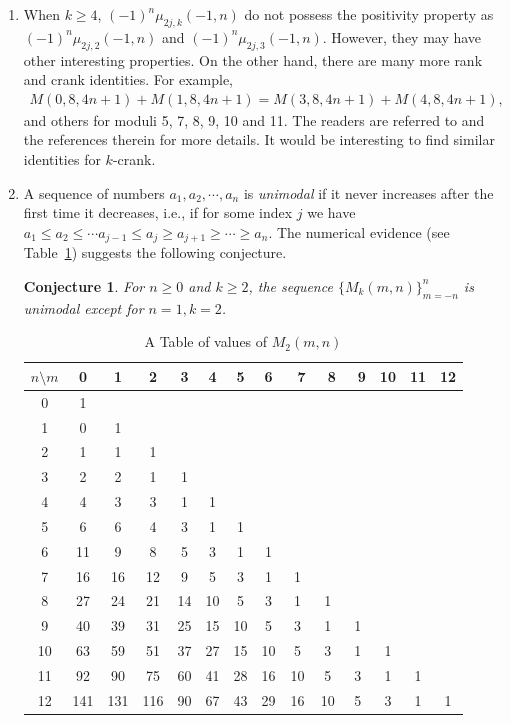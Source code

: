 \documentclass[12pt]{amsart}
\numberwithin{equation}{section}
\theoremstyle{plain}
\newtheorem{conjecture}[theorem]{Conjecture}
\theoremstyle{definition}
\begin{document}
\begin{enumerate}[1)]
\item When $k\geq4$, $(-1)^{n}\mu_{2j,k}(-1,n)$ do not possess the positivity property as $(-1)^{n}\mu_{2j,2}(-1,n)$ and $(-1)^{n}\mu_{2j,3}(-1,n)$. However, they may have other interesting properties. On the other hand, there are many more rank and crank identities. For example,
\begin{align*}
M(0,8,4n+1)+M(1,8,4n+1)=M(3,8,4n+1)+M(4,8,4n+1),
\end{align*}
and others for moduli 5, 7, 8, 9, 10 and 11. The readers are referred to \cite{Gar1,Gar3,LS} and the references therein for more details. It would be interesting to find similar identities for $k$-crank.

\item A sequence of numbers $a_{1}, a_{2}, \cdots, a_{n}$ is \emph{unimodal} if it never increases after the first time it decreases, i.e., if for some index $j$ we have $a_{1}\leq a_{2}\leq\cdots a_{j-1}\leq a_{j}\geq a_{j+1}\geq\cdots\geq a_n$. The numerical evidence (see Table~\ref{Tab1}) suggests the following conjecture.
\begin{conjecture}\label{conj:unimodal}
For $n\geq 0$ and $k\geq 2$, the sequence $\{M_{k}(m,n)\}_{m=-n}^{n}$ is unimodal except for $n=1,k=2$.
\end{conjecture}
\begin{table}[tbp]\caption{A Table of values of $M_{2}(m,n)$}\label{Tab1}
\centering
\begin{tabular}{cccccccccccccc}
\hline
$n\setminus m$ &0 &1 &2 &3 &4 &5 &6 &~7 &~8 &~9 &10 &11 & 12\\
\hline
0 &1 & & & & & & & & & & &\\
1 &0 &1 & & & & & & & & & &\\
2 &1 &1 &1 & & & & & & & & &\\
3 &2 &2 &1 &1 & & & & & & & &\\
4 &4 &3 &3 &1 &1 & & & & & & &\\
5 &6 &6 &4 &3 &1 &1 & & & & & &\\
6 &11 &9 &8 &5 &3 &1 &1 & & & & &\\
7 &16 &16 &12 &9 &5 &3 &1 &1 & & & &\\
8 &27 &24 &21 &14 &10 &5 &3 &1 &1 & & &\\
9 &40 &39 &31 &25 &15 &10 &5 &3 &1 &1 & & &\\
10 &63 &59 &51 &37 &27 &15 &10 &5 &3 &1 &1 & &\\
11 &92 &90 &75 &60 &41 &28 &16 &10 &5 &3 &1 &1 &\\
12 &141 &131 &116 &90 &67 &43 &29 &16 &10 &5 &3 &1 &1 \\
\hline
\end{tabular}
\end{table}


\end{enumerate}
\end{document}
